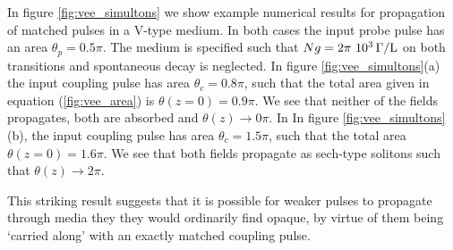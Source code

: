     In figure \ref{fig:vee_simultons} we show example numerical results for
    propagation of matched pulses in a V-type medium. In both cases the input
    probe pulse has an area $\theta_p = 0.5 \pi$. The medium is specified such
    that $Ng = \unit[2\pi~10^3]{\Gamma/L}$ on both transitions and spontaneous
    decay is neglected. In figure \ref{fig:vee_simultons}(a) the input coupling
    pulse has area $\theta_c = 0.8 \pi$, such that the total area given in
    equation (\ref{fig:vee_area}) is $\theta(z{=}0) = 0.9 \pi$. We see that
    neither of the fields propagates, both are absorbed and $\theta(z)
    \rightarrow 0 \pi$. In In figure \ref{fig:vee_simultons}(b), the input
    coupling pulse has area $\theta_c = 1.5 \pi$, such that the total area
    $\theta(z{=}0) = 1.6 \pi$. We see that both fields propagate as sech-type
    solitons such that $\theta(z) \rightarrow 2 \pi$.

    This striking result suggests that it is possible for weaker pulses to
    propagate through media they they would ordinarily find opaque, by virtue of
    them being `carried along' with an exactly matched coupling pulse.

